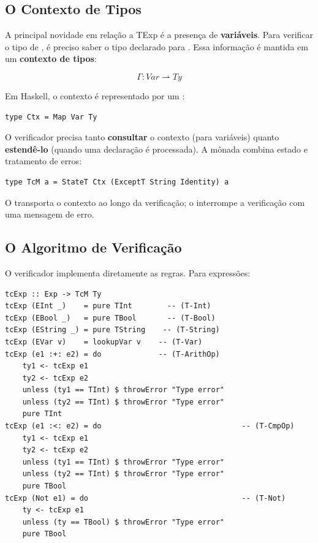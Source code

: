 \subsection{O Contexto de Tipos}

A principal novidade em relação a TExp é a presença de
\textbf{variáveis}. Para verificar o tipo de
, é preciso saber o tipo declarado
para . Essa informação é mantida em um
\textbf{contexto de tipos}:

\[
  \Gamma : \mathit{Var} \rightharpoonup \mathit{Ty}
\]

Em Haskell, o contexto é representado por um :

\begin{verbatim}
type Ctx = Map Var Ty
\end{verbatim}

O verificador precisa tanto \textbf{consultar} o contexto (para
variáveis) quanto \textbf{estendê-lo} (quando uma declaração é
processada). A mônada combina estado e tratamento de erros:

\begin{verbatim}
type TcM a = StateT Ctx (ExceptT String Identity) a
\end{verbatim}

O  transporta o contexto ao longo
da verificação; o  interrompe
a verificação com uma mensagem de erro.

\subsection{O Algoritmo de Verificação}

O verificador implementa diretamente as regras. Para expressões:

\begin{verbatim}
tcExp :: Exp -> TcM Ty
tcExp (EInt _)    = pure TInt        -- (T-Int)
tcExp (EBool _)   = pure TBool       -- (T-Bool)
tcExp (EString _) = pure TString    -- (T-String)
tcExp (EVar v)    = lookupVar v    -- (T-Var)
tcExp (e1 :+: e2) = do             -- (T-ArithOp)
    ty1 <- tcExp e1
    ty2 <- tcExp e2
    unless (ty1 == TInt) $ throwError "Type error"
    unless (ty2 == TInt) $ throwError "Type error"
    pure TInt
tcExp (e1 :<: e2) = do                                -- (T-CmpOp)
    ty1 <- tcExp e1
    ty2 <- tcExp e2
    unless (ty1 == TInt) $ throwError "Type error"
    unless (ty2 == TInt) $ throwError "Type error"
    pure TBool
tcExp (Not e1) = do                                   -- (T-Not)
    ty <- tcExp e1
    unless (ty == TBool) $ throwError "Type error"
    pure TBool
\end{verbatim}

